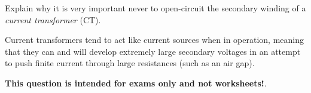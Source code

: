 

Explain why it is very important never to open-circuit the secondary winding of a {\it current transformer} (CT).







Current transformers tend to act like current sources when in operation, meaning that they can and will develop extremely large secondary voltages in an attempt to push finite current through large resistances (such as an air gap).







{\bf This question is intended for exams only and not worksheets!}.



